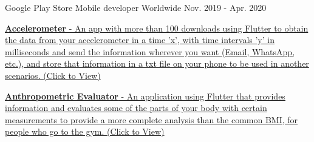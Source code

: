 \begin{cventries}
  \cventry
  {Google Play Store} %
  {Mobile developer} %
  {Worldwide} %
  {Nov. 2019 - Apr. 2020} %
  {
    \begin{cvitems} %
      \item {\href{https://play.google.com/store/apps/details?id=com.grisu.accelerometer}{
                    \textbf{Accelerometer} - An app with more than 100 downloads using Flutter to obtain the data from your accelerometer
                    in a time 'x', with time intervals 'y' in milliseconds and send the information wherever you
                    want (Email, WhatsApp, etc.), and store that information in a txt file on your phone to be
                    used in another scenarios. (Click to View)}}
      \item {\href{https://play.google.com/store/apps/details?id=com.grisu.anthropometric_evaluator}{
                    \textbf{Anthropometric Evaluator} - An application using Flutter that provides information
                    and evaluates some of the parts of your body with certain measurements to provide a more
                    complete analysis than the common BMI, for people who go to the gym. (Click to View)}}
    \end{cvitems}
  }
\end{cventries}
